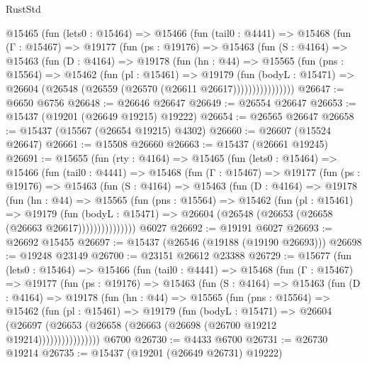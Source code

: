 \begin{lexlean}{RustStd}
\begin{coremodule}
      @15465
        (fun (lets0 : @15464) =>
        @15466
          (fun (tail0 : @4441) =>
          @15468
            (fun (Γ : @15467) =>
            @19177
              (fun (ps : @19176) =>
              @15463
                (fun (S : @4164) =>
                @15463
                  (fun (D : @4164) =>
                  @19178
                    (fun (hn : @44) =>
                    @15565
                      (fun (pns : @15564) =>
                      @15462
                        (fun (pl : @15461) =>
                        @19179
                          (fun (bodyL : @15471) =>
                          @26604 (@26548 (@26559 (@26570 (@26611 @26617))))))))))))))))
@26647 := @6650 @6756
@26648 := @26646 @26647
@26649 := @26554 @26647
@26653 := @15437 (@19201 (@26649 @19215) @19222)
@26654 := @26565 @26647
@26658 := @15437 (@15567 (@26654 @19215) @4302)
@26660 := @26607 (@15524 @26647)
@26661 := @15508 @26660
@26663 := @15437 (@26661 @19245)
@26691 := @15655
    (fun (rty : @4164) =>
    @15465
      (fun (lets0 : @15464) =>
      @15466
        (fun (tail0 : @4441) =>
        @15468
          (fun (Γ : @15467) =>
          @19177
            (fun (ps : @19176) =>
            @15463
              (fun (S : @4164) =>
              @15463
                (fun (D : @4164) =>
                @19178
                  (fun (hn : @44) =>
                  @15565
                    (fun (pns : @15564) =>
                    @15462
                      (fun (pl : @15461) =>
                      @19179
                        (fun (bodyL : @15471) =>
                        @26604 (@26548 (@26653 (@26658 (@26663 @26617)))))))))))))))
    @6027
@26692 := @19191 @6027
@26693 := @26692 @15455
@26697 := @15437 (@26546 (@19188 (@19190 @26693)))
@26698 := @19248 @23149
@26700 := @23151 @26612 @23388
@26729 := @15677
    (fun (lets0 : @15464) =>
    @15466
      (fun (tail0 : @4441) =>
      @15468
        (fun (Γ : @15467) =>
        @19177
          (fun (ps : @19176) =>
          @15463
            (fun (S : @4164) =>
            @15463
              (fun (D : @4164) =>
              @19178
                (fun (hn : @44) =>
                @15565
                  (fun (pns : @15564) =>
                  @15462
                    (fun (pl : @15461) =>
                    @19179
                      (fun (bodyL : @15471) =>
                      @26604
                        (@26697
                          (@26653 (@26658 (@26663 (@26698 (@26700 @19212 @19214))))))))))))))))
    @6700
@26730 := @4433 @6700
@26731 := @26730 @19214
@26735 := @15437 (@19201 (@26649 @26731) @19222)

\end{coremodule}
\end{lexlean}
